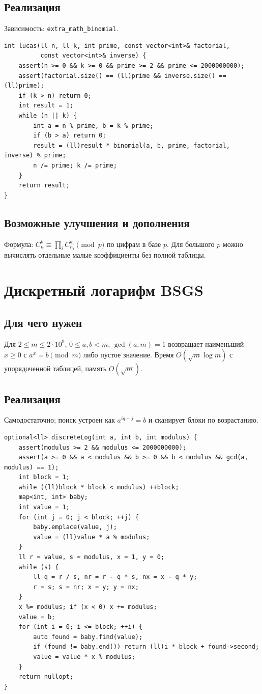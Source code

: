 \subsection*{Реализация}
Зависимость: \texttt{extra\_math\_binomial}.
\begin{lstlisting}[name=extra_math_lucas]
int lucas(ll n, ll k, int prime, const vector<int>& factorial,
          const vector<int>& inverse) {
    assert(n >= 0 && k >= 0 && prime >= 2 && prime <= 2000000000);
    assert(factorial.size() == (ll)prime && inverse.size() == (ll)prime);
    if (k > n) return 0;
    int result = 1;
    while (n || k) {
        int a = n % prime, b = k % prime;
        if (b > a) return 0;
        result = (ll)result * binomial(a, b, prime, factorial, inverse) % prime;
        n /= prime; k /= prime;
    }
    return result;
}
\end{lstlisting}
\subsection*{Возможные улучшения и дополнения}
Формула: $C_n^k\equiv\prod_i C_{n_i}^{k_i}\pmod p$ по цифрам в базе $p$.
Для большого $p$ можно вычислять отдельные малые коэффициенты без полной таблицы.


\fi
\iffalse
\section{Дискретный логарифм BSGS}
\subsection*{Для чего нужен}
Для $2\le m\le2\cdot10^9$, $0\le a,b<m$, $\gcd(a,m)=1$
возвращает наименьший $x\ge0$ с $a^x=b\pmod m$ либо пустое значение.
Время $O(\sqrt m\log m)$ с упорядоченной таблицей, память $O(\sqrt m)$.
\subsection*{Реализация}
Самодостаточно; поиск устроен как $a^{iq+j}=b$ и сканирует блоки по возрастанию.
\begin{lstlisting}[name=extra_math_bsgs]
optional<ll> discreteLog(int a, int b, int modulus) {
    assert(modulus >= 2 && modulus <= 2000000000);
    assert(a >= 0 && a < modulus && b >= 0 && b < modulus && gcd(a, modulus) == 1);
    int block = 1;
    while ((ll)block * block < modulus) ++block;
    map<int, int> baby;
    int value = 1;
    for (int j = 0; j < block; ++j) {
        baby.emplace(value, j);
        value = (ll)value * a % modulus;
    }
    ll r = value, s = modulus, x = 1, y = 0;
    while (s) {
        ll q = r / s, nr = r - q * s, nx = x - q * y;
        r = s; s = nr; x = y; y = nx;
    }
    x %= modulus; if (x < 0) x += modulus;
    value = b;
    for (int i = 0; i <= block; ++i) {
        auto found = baby.find(value);
        if (found != baby.end()) return (ll)i * block + found->second;
        value = value * x % modulus;
    }
    return nullopt;
}
\end{lstlisting}
